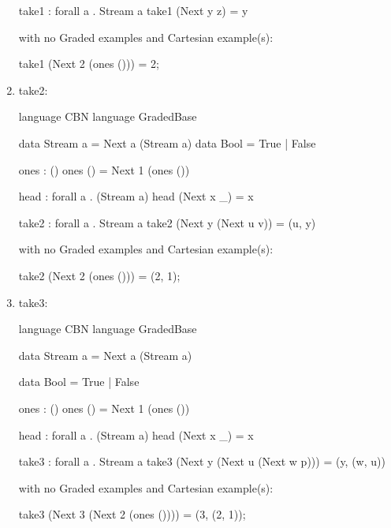 \begin{enumerate}
\begin{granule}
take1 : forall a . Stream a %
take1 (Next y z) = y
\end{granule}
with no Graded examples and Cartesian example(s):
\begin{granule}
take1 (Next 2 (ones ())) = 2;
\end{granule}
\item take2: 
\begin{granule}
language CBN 
language GradedBase 

data Stream a = Next a (Stream a) 
data Bool = True | False

ones : () %
ones () = Next 1 (ones ())

head : forall a . (Stream a) %
head (Next x _) = x

take2 : forall a . Stream a %
take2 (Next y (Next u v)) = (u, y)
\end{granule}
with no Graded examples and Cartesian example(s):
\begin{granule}
take2 (Next 2 (ones ())) = (2, 1);
\end{granule}
\item take3: 
\begin{granule}
language CBN 
language GradedBase 

data Stream a = Next a (Stream a) 

data Bool = True | False

ones : () %
ones () = Next 1 (ones ())

head : forall a . (Stream a) %
head (Next x _) = x

take3 : forall a . Stream a %
take3 (Next y (Next u (Next w p))) = (y, (w, u))
\end{granule}
with no Graded examples and Cartesian example(s):
\begin{granule}
take3 (Next 3 (Next 2 (ones ()))) = (3, (2, 1));
\end{granule}
\end{enumerate}
